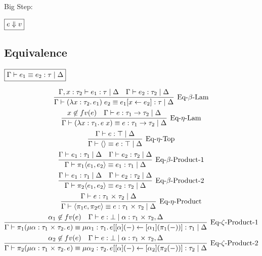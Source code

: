 Big Step:

$\fbox{$e \Downarrow v$}$

\subsection{Equivalence}

$\fbox{$\Gamma \vdash e_1 \equiv e_2: \tau \mid \Delta$}$

\begin{gather*}
  \infer[\text{Eq-$\beta$-Lam}]{\Gamma \vdash (\lambda x: \tau_2\ldotp e_1)\; e_2 \equiv e_1[x \assign e_2]: \tau \mid \Delta}{
    \Gamma, x: \tau_2 \vdash e_1: \tau \mid \Delta
    &
    \Gamma \vdash e_2: \tau_2 \mid \Delta
  }
  \\
  \infer[\text{Eq-$\eta$-Lam}]{\Gamma \vdash (\lambda x: \tau_1\ldotp e\; x) \equiv e: \tau_1 \to \tau_2 \mid \Delta}{
    x \not\in \freevar(e)
    &
    \Gamma \vdash e: \tau_1 \to \tau_2 \mid \Delta
  }
  \\
  \infer[\text{Eq-$\eta$-Top}]{\Gamma \vdash \langle\rangle \equiv e: \top \mid \Delta}{
    \Gamma \vdash e: \top \mid \Delta
  }
  \\
  \infer[\text{Eq-$\beta$-Product-1}]{\Gamma \vdash \pi_1\langle e_1, e_2\rangle \equiv e_1: \tau_1 \mid \Delta}{
    \Gamma \vdash e_1: \tau_1 \mid \Delta
    &
    \Gamma \vdash e_2: \tau_2 \mid \Delta
  }
  \\
  \infer[\text{Eq-$\beta$-Product-2}]{\Gamma \vdash \pi_2\langle e_1, e_2\rangle \equiv e_2: \tau_2 \mid \Delta}{
    \Gamma \vdash e_1: \tau_1 \mid \Delta
    &
    \Gamma \vdash e_2: \tau_2 \mid \Delta
  }
  \\
  \infer[\text{Eq-$\eta$-Product}]{\Gamma \vdash \langle \pi_1 e, \pi_2 e\rangle \equiv e: \tau_1 \multi \tau_2 \mid \Delta}{
    \Gamma \vdash e: \tau_1 \multi \tau_2 \mid \Delta
  }
  \\
  \infer[\text{Eq-$\zeta$-Product-1}]{\Gamma \vdash \pi_1 (\mu \alpha: \tau_1 \multi \tau_2\ldotp e) \equiv \mu \alpha_1: \tau_1\ldotp e[[\alpha](-) \assign [\alpha_1](\pi_1 (-))]: \tau_1 \mid \Delta}{
    \alpha_1 \not\in \freevar(e)
    &
    \Gamma \vdash e: \bot \mid \alpha: \tau_1 \multi \tau_2, \Delta
  }
  \\
  \infer[\text{Eq-$\zeta$-Product-2}]{\Gamma \vdash \pi_2 (\mu \alpha: \tau_1 \multi \tau_2\ldotp e) \equiv \mu \alpha_2: \tau_2\ldotp e[[\alpha](-) \assign [\alpha_2](\pi_2 (-))]: \tau_2 \mid \Delta}{
    \alpha_2 \not\in \freevar(e)
    &
    \Gamma \vdash e: \bot \mid \alpha: \tau_1 \multi \tau_2, \Delta
}
\end{gather*}
